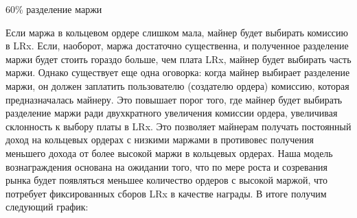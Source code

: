 \documentclass[utf8,nofonts]{article}
\makeatletter
\newenvironment{figurehere}
 {\def\@captype{figure}}
 {}
\makeatother
\begin{document}
\begin{multicols}{2}
\begin{center}
\begin{figurehere}
			\caption{60\% разделение маржи}
			\label{fig:marginsplit}
		\end{figurehere}
	\end{center}
	Если маржа в кольцевом ордере слишком мала, майнер будет выбирать комиссию в LRx. Если, наоборот, маржа достаточно существенна, и полученное разделение маржи будет стоить гораздо больше, чем плата LRx, майнер будет выбирать часть маржи. Однако существует еще одна оговорка: когда майнер выбирает разделение маржи, он должен заплатить пользователю (создателю ордера) комиссию, которая предназначалась майнеру. Это повышает порог того, где майнер будет выбирать разделение маржи ради двухкратного увеличения комиссии ордера, увеличивая склонность к выбору платы в LRx. Это позволяет майнерам получать постоянный доход на кольцевых ордерах с низкими маржами в противовес получения меньшего дохода от более высокой маржи в кольцевых ордерах. Наша модель вознаграждения основана на ожидании того, что по мере роста и созревания рынка будет появляться меньшее количество ордеров с высокой маржой, что потребует фиксированных сборов LRx в качестве награды.
	В итоге получим следующий график:
	\begin{center}
		\begin{figurehere}
			\centering
\end{figurehere}
\end{center}
\end{multicols}
\end{document}
